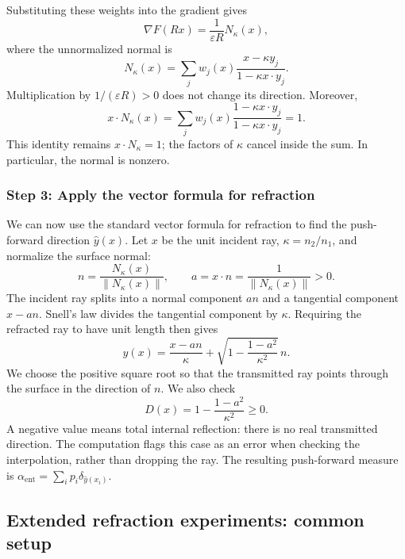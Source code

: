 Substituting these weights into the gradient gives
\[
 \nabla F(Rx)=\frac1{\varepsilon R}N_\kappa(x),
\]
where the unnormalized normal is
\begin{equation}
 \boxed{N_\kappa(x)=\sum_jw_j(x)
              \frac{x-\kappa y_j}{1-\kappa x\cdot y_j}.}
 \label{eq:new-normal}
\end{equation}
Multiplication by $1/(\varepsilon R)>0$ does not change its direction.
Moreover,
\begin{equation}
 x\cdot N_\kappa(x)
 =\sum_jw_j(x)\frac{1-\kappa x\cdot y_j}
                       {1-\kappa x\cdot y_j}
 =1.
 \label{eq:new-normal-identity}
\end{equation}
This identity remains $x\cdot N_\kappa=1$; the factors of $\kappa$ cancel
inside the sum. In particular, the normal is nonzero.

\subsubsection{Step 3: Apply the vector formula for refraction}

We can now use the standard vector formula for refraction to find the
push-forward direction $\widehat y(x)$. Let $x$ be the unit incident ray,
$\kappa=n_2/n_1$, and normalize the surface normal:
\[
 n=\frac{N_\kappa(x)}{\|N_\kappa(x)\|},
 \qquad a=x\cdot n=\frac{1}{\|N_\kappa(x)\|}>0.
\]
The incident ray splits into a normal component $an$ and a tangential
component $x-an$. Snell's law divides the tangential component by
$\kappa$. Requiring the refracted ray to have unit length then gives
\begin{equation}
 \boxed{\widehat y(x)=\frac{x-an}{\kappa}
       +\sqrt{1-\frac{1-a^2}{\kappa^2}}\,n.}
 \label{eq:new-snell-map}
\end{equation}
We choose the positive square root so that the transmitted ray points
through the surface in the direction of $n$. We also check
\[
 D(x)=1-\frac{1-a^2}{\kappa^2}\geq0.
\]
A negative value means total internal reflection: there is no real
transmitted direction. The computation flags this case as an error when
checking the interpolation, rather than dropping the ray. The resulting
push-forward measure is $\alpha_{\mathrm{ent}}=\sum_i p_i
\delta_{\widehat y(x_i)}$.

\subsection{Extended refraction experiments: common setup}

